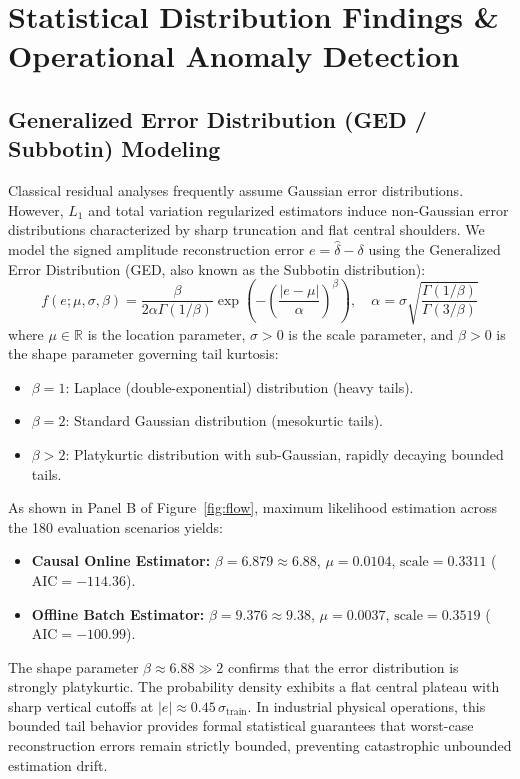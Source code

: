 \documentclass[11pt,a4paper]{article}
\begin{document}
\section{Statistical Distribution Findings \& Operational Anomaly Detection}

\subsection{Generalized Error Distribution (GED / Subbotin) Modeling}
Classical residual analyses frequently assume Gaussian error distributions. However, $L_1$ and total variation regularized estimators induce non-Gaussian error distributions characterized by sharp truncation and flat central shoulders. We model the signed amplitude reconstruction error $e = \hat{\delta} - \delta$ using the Generalized Error Distribution (GED, also known as the Subbotin distribution):
\begin{equation}
f(e; \mu, \sigma, \beta) = \frac{\beta}{2 \alpha \Gamma(1/\beta)} \exp\left( - \left(\frac{|e - \mu|}{\alpha}\right)^\beta \right), \quad \alpha = \sigma \sqrt{\frac{\Gamma(1/\beta)}{\Gamma(3/\beta)}}
\end{equation}
where $\mu \in \mathbb{R}$ is the location parameter, $\sigma > 0$ is the scale parameter, and $\beta > 0$ is the shape parameter governing tail kurtosis:
\begin{itemize}
    \item $\beta = 1$: Laplace (double-exponential) distribution (heavy tails).
    \item $\beta = 2$: Standard Gaussian distribution (mesokurtic tails).
    \item $\beta > 2$: Platykurtic distribution with sub-Gaussian, rapidly decaying bounded tails.
\end{itemize}

As shown in Panel B of Figure~\ref{fig:flow}, maximum likelihood estimation across the 180 evaluation scenarios yields:
\begin{itemize}
    \item \textbf{Causal Online Estimator:} $\beta = 6.879 \approx 6.88$, $\mu = 0.0104$, $\text{scale} = 0.3311$ ($\text{AIC} = -114.36$).
    \item \textbf{Offline Batch Estimator:} $\beta = 9.376 \approx 9.38$, $\mu = 0.0037$, $\text{scale} = 0.3519$ ($\text{AIC} = -100.99$).
\end{itemize}
The shape parameter $\beta \approx 6.88 \gg 2$ confirms that the error distribution is strongly platykurtic. The probability density exhibits a flat central plateau with sharp vertical cutoffs at $|e| \approx 0.45\,\sigma_{\text{train}}$. In industrial physical operations, this bounded tail behavior provides formal statistical guarantees that worst-case reconstruction errors remain strictly bounded, preventing catastrophic unbounded estimation drift.
\end{document}

